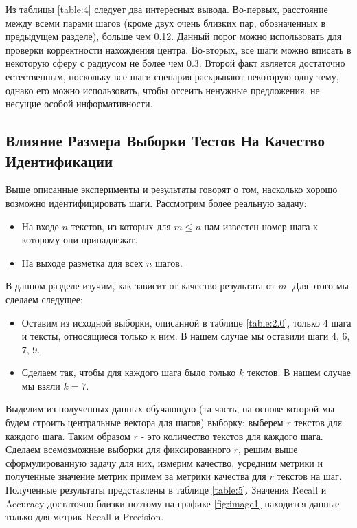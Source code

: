 \documentclass[12pt]{article}
\begin{document}
Из таблицы \ref{table:4} следует два интересных вывода. Во-первых, расстояние между всеми парами шагов (кроме двух очень близких пар, обозначенных в предыдущем разделе), больше чем 0.12. Данный порог можно использовать для проверки корректности нахождения центра. Во-вторых, все шаги можно вписать в некоторую сферу с радиусом не более чем 0.3. Второй факт является достаточно естественным, поскольку все шаги сценария раскрывают некоторую одну тему, однако его можно использовать, чтобы отсеить ненужные предложения, не несущие особой информативности.

\subsection{Влияние Размера Выборки Тестов На Качество Идентификации}

Выше описанные эксперименты и результаты говорят о том, насколько хорошо возможно идентифицировать шаги. Рассмотрим более реальную задачу:

\begin{itemize}
	\item На входе $n$ текстов, из которых для $m\leq n$ нам известен номер шага к которому они принадлежат.
	\item На выходе разметка для всех $n$ шагов.
\end{itemize}

В данном разделе изучим, как зависит от качество результата от $m$. Для этого мы сделаем следущее:
\begin{itemize}
	\item Оставим из исходной выборки, описанной в таблице \ref{table:2.0}, только 4 шага и тексты, относящиеся только к ним. В нашем случае мы оставили шаги 4, 6, 7, 9.
	\item Сделаем так, чтобы для каждого шага было только $k$ текстов. В нашем случае мы взяли $k=7$.
\end{itemize}
Выделим из полученных данных обучающую (та часть, на основе которой мы будем строить центральные вектора для шагов) выборку: выберем $r$ текстов для каждого шага. Таким образом $r$ - это количество текстов для каждого шага. Сделаем всемозможные выборки для фиксированного $r$, решим выше сформулированную задачу для них, измерим качество, усредним метрики и полученные значение метрик примем за метрики качества для $r$ текстов на шаг. Полученные результаты представлены в таблице \ref{table:5}. Значения Recall и Accuracy достаточно близки поэтому на графике \ref{fig:image1} находится данные только для метрик Recall и Precision.
\end{document}
